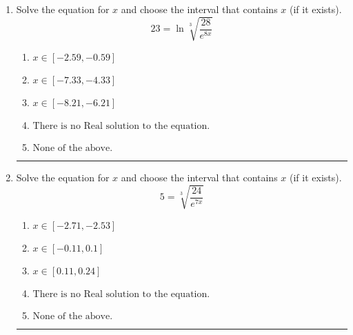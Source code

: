 \documentclass[14pt]{extbook}
\newcommand{\litem}[1]{\item#1\hspace*{-1cm}\rule{\textwidth}{0.4pt}}
\begin{document}
\begin{enumerate}
{\begin{enumerate}[label=\Alph*.]
\end{enumerate} }
\litem{
 Solve the equation for $x$ and choose the interval that contains $x$ (if it exists).\[  23 = \ln{\sqrt[3]{\frac{28}{e^{8x}}}} \]\begin{enumerate}[label=\Alph*.]
\item \( x \in [-2.59, -0.59] \)
\item \( x \in [-7.33, -4.33] \)
\item \( x \in [-8.21, -6.21] \)
\item \( \text{There is no Real solution to the equation.} \)
\item \( \text{None of the above.} \)

\end{enumerate} }
\litem{
 Solve the equation for $x$ and choose the interval that contains $x$ (if it exists).\[  5 = \sqrt[3]{\frac{24}{e^{7x}}} \]\begin{enumerate}[label=\Alph*.]
\item \( x \in [-2.71, -2.53] \)
\item \( x \in [-0.11, 0.1] \)
\item \( x \in [0.11, 0.24] \)
\item \( \text{There is no Real solution to the equation.} \)
\item \( \text{None of the above.} \)

\end{enumerate} }
\end{enumerate}
\end{document}
